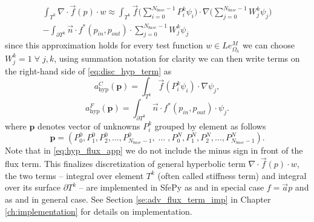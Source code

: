 \begin{multline}
    \label{eq:disc_hyp_term}
    \int_{T^k} \nabla\cdot \vec{f}(p)\cdot w \approx \int_{T^k} 
    \vec{f}\Big(\sum\limits_{i=0}^{N_{base} - 1} 
    P_i^k\psi_i\Big)\cdot\nabla\Big(\sum\limits_{j=0}^{N_{base} - 1} 
    W_j^k\psi_j\Big)\\    
    -\int_{\partial{T^k}} \vec{n} \cdot f^{*} (p_{in}, p_{out})\cdot 
    \sum\limits_{j=0}^{N_{base} - 1} W_j^k\psi_j
\end{multline}
since this approximation holds for every test function $w \in 
Le_{\Omega_h}^{M}$ we can choose $W_j^k = 1 \; \forall \; 
j, k$, using summation notation for clarity we can then write terms on the  right-hand 
side of \eqref{eq:disc_hyp_term} as 
\begin{equation}\label{eq:hyp_stiff_app}
    a^C_\mathrm{hyp}(\mathbf{p}) = \int_{T^k} \vec{f}(P_i^k\psi_i)\cdot\nabla\psi_j, 
\end{equation}
\begin{equation}\label{eq:hyp_flux_app}
    a^F_\mathrm{hyp}(\mathbf{p}) = \int_{\partial{T^k}} \vec{n} \cdot f^{*} (p_{in}, 
    p_{out})\cdot\psi_j.
\end{equation}
where $\mathbf{p}$ denotes vector of unknowns $P^k_i$ grouped by element as follows
\begin{equation}
    \mathbf{p} = \left(P^0_0, P^0_1, P^0_2, \ldots, P^0_{N_{base}-1}, \; \ldots \; ,
    P^{N}_0, P^{N}_1, P^{N}_2, \ldots, P^{N}_{N_{base} - 1}  \right).
\end{equation}
Note that in \eqref{eq:hyp_flux_app} we do not include the minus sign in front 
of the flux term.
This finalizes discretization of general hyperbolic term 
$\nabla\cdot\vec{f}(p) 
\cdot w$, the two terms -- integral over element $T^k$ (often called stiffness 
term) and integral over its surface $\partial T^k$ -- are implemented in SfePy 
as  and  in special 
case $f = \vec{a}p$ and as  and 
 in general case. See Section 
\ref{se:adv_flux_term_imp} in Chapter \ref{ch:implementation} for details on 
implementation.


